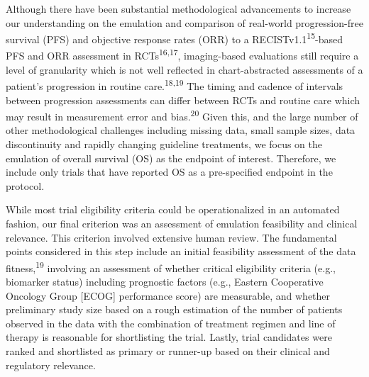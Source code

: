 \documentclass[
  letterpaper,
  DIV=11,
  numbers=noendperiod]{scrartcl}
\begin{document}
Although there have been substantial methodological advancements to
increase our understanding on the emulation and comparison of real-world
progression-free survival (PFS) and objective response rates (ORR) to a
RECISTv1.1\textsuperscript{15}-based PFS and ORR assessment in
RCTs\textsuperscript{16,17}, imaging-based evaluations still require a
level of granularity which is not well reflected in chart-abstracted
assessments of a patient's progression in routine
care.\textsuperscript{18,19} The timing and cadence of intervals between
progression assessments can differ between RCTs and routine care which
may result in measurement error and bias.\textsuperscript{20} Given
this, and the large number of other methodological challenges including
missing data, small sample sizes, data discontinuity and rapidly
changing guideline treatments, we focus on the emulation of overall
survival (OS) as the endpoint of interest. Therefore, we include only
trials that have reported OS as a pre-specified endpoint in the
protocol.

While most trial eligibility criteria could be operationalized in an
automated fashion, our final criterion was an assessment of emulation
feasibility and clinical relevance. This criterion involved extensive
human review. The fundamental points considered in this step include an
initial feasibility assessment of the data fitness,\textsuperscript{19}
involving an assessment of whether critical eligibility criteria (e.g.,
biomarker status) including prognostic factors (e.g., Eastern
Cooperative Oncology Group {[}ECOG{]} performance score) are measurable,
and whether preliminary study size based on a rough estimation of the
number of patients observed in the data with the combination of
treatment regimen and line of therapy is reasonable for shortlisting the
trial. Lastly, trial candidates were ranked and shortlisted as primary
or runner-up based on their clinical and regulatory relevance.
\end{document}

